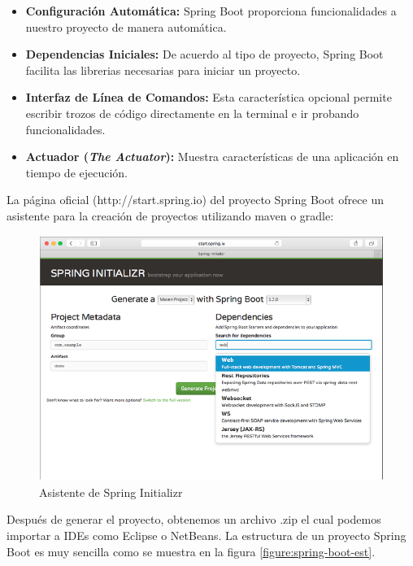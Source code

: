 		\begin{itemize}
		  \item {\bf Configuración Automática:} {Spring Boot
		  proporciona funcionalidades a nuestro proyecto de manera automática.}
		  
		  \item {\bf Dependencias Iniciales:} {De acuerdo al tipo de proyecto, Spring
		  Boot facilita las librerias necesarias para iniciar un proyecto.}
		  
		  \item {\bf Interfaz de Línea de Comandos:} {Esta característica opcional
		  permite escribir trozos de código directamente en la terminal e ir
		  probando funcionalidades.}
		  
		  \item {\bf Actuador (\textit{The Actuator}):} {Muestra características de
		  una aplicación en tiempo de ejecución.}
		\end{itemize}
		
		La página oficial (http://start.spring.io) del proyecto Spring Boot ofrece un
		asistente para la creación de proyectos utilizando maven o gradle:
		
		\begin{figure}[H]
		    \centering
			\includegraphics[width=14cm]{../imgs/ejemplos/spring-boot.png}
			\caption{Asistente de Spring Initializr}
			\label{figure:spring-boot}
		\end{figure}
		
		Después de generar el proyecto, obtenemos un archivo .zip el cual podemos
		importar a IDEs como Eclipse o NetBeans. La estructura de un proyecto Spring
		Boot es muy sencilla como se muestra en la figura
		\ref{figure:spring-boot-est}.


